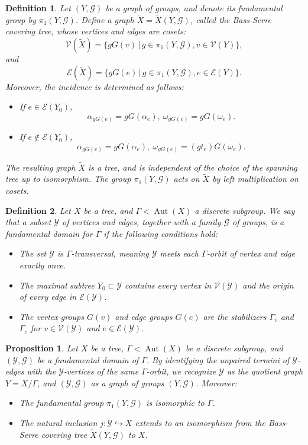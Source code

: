 \documentclass[12pt,leqno]{amsart}
\newcommand{\2}{L^2_{\rm per}(0, T)}
\newtheorem{prop}{Proposition}[section]
\newtheorem{defn}{Definition}[section]
\newcommand{\aut}{{\operatorname{Aut}}}
\numberwithin{equation}{section}
\numberwithin{figure}{section}
\begin{document}
\begin{defn}
    Let $(Y,\mathcal{G})$ be a graph of groups, and denote its fundamental group by $\pi_1(Y,\mathcal{G})$. Define a graph $\widetilde{X} = \widetilde{X}(Y,\mathcal{G})$, called the \emph{Bass-Serre covering tree}, whose vertices and edges are cosets:
    \[
    \mathcal{V}(\widetilde{X}) = \{gG(v)\,|\, g\in \pi_1(Y,\mathcal{G}), v\in \mathcal{V}(Y)\},
    \]
    and
    \[
    \mathcal{E}(\widetilde{X}) =\{gG(e)\,|\, g\in \pi_1(Y,\mathcal{G}), e\in \mathcal{E}(Y)\}.
    \]
    Moreover, the incidence is determined as follows:
    \begin{itemize}
        \item If $e\in \mathcal{E}(Y_0)$,
        \[
        \alpha_{gG(e)} = gG(\alpha_e),\ \omega_{gG(e)} = gG(\omega_e).
        \]
        \item If $e\notin \mathcal{E}(Y_0)$,
        \[
        \alpha_{gG(e)} = gG(\alpha_e),\ \omega_{gG(e)} = (gt_e)G(\omega_e).
        \]
    \end{itemize}
    The resulting graph $\widetilde{X}$ is a tree, and is independent of the choice of the spanning tree up to isomorphism. The group $\pi_1(Y,\mathcal{G})$ acts on $\widetilde{X}$ by left multiplication on cosets.
\end{defn}
\begin{defn}\label{def:fundamental_domain}
    Let $X$ be a tree, and $\Gamma<\aut(X)$ a discrete subgroup. We say that a subset $\mathcal{Y}$ of vertices and edges, together with a family $\mathcal{G}$ of groups, is a \emph{fundamental domain} for $\Gamma$ if the following conditions hold:
    \begin{itemize}
        \item The set $\mathcal{Y}$ is $\Gamma$-transversal, meaning $\mathcal{Y}$ meets each $\Gamma$-orbit of vertex and edge exactly once.
        \item The maximal subtree $Y_0\subset \mathcal{Y}$ contains every vertex in $\mathcal{V}(\mathcal{Y})$ and the origin of every edge in $\mathcal{E}(\mathcal{Y})$.
        \item The vertex groups $G(v)$ and edge groups $G(e)$ are the stabilizers $\Gamma_v$ and $\Gamma_e$ for $v\in \mathcal{V}(\mathcal{Y})$ and $e\in \mathcal{E}(\mathcal{Y})$.
    \end{itemize}
\end{defn}
\begin{prop}
    Let $X$ be a tree, $\Gamma<\aut(X)$ be a discrete subgroup, and $(\mathcal{Y},\mathcal{G})$ be a fundamental domain of $\Gamma$. By identifying the unpaired termini of $\mathcal{Y}$-edges with the $\mathcal{Y}$-vertices of the same $\Gamma$-orbit, we recognize $\mathcal{Y}$ as the quotient graph $Y = X/\Gamma$, and $(\mathcal{Y},\mathcal{G})$ as a graph of groups $(Y,\mathcal{G})$. Moreover:
    \begin{itemize}
        \item The fundamental group $\pi_1(Y,\mathcal{G})$ is isomorphic to $\Gamma$.
        \item The natural inclusion $j: \mathcal{Y}\hookrightarrow X$ extends to an isomorphism from the Bass-Serre covering tree $\widetilde{X}(Y,\mathcal{G})$ to $X$.
    \end{itemize}
\end{prop}
\end{document}
